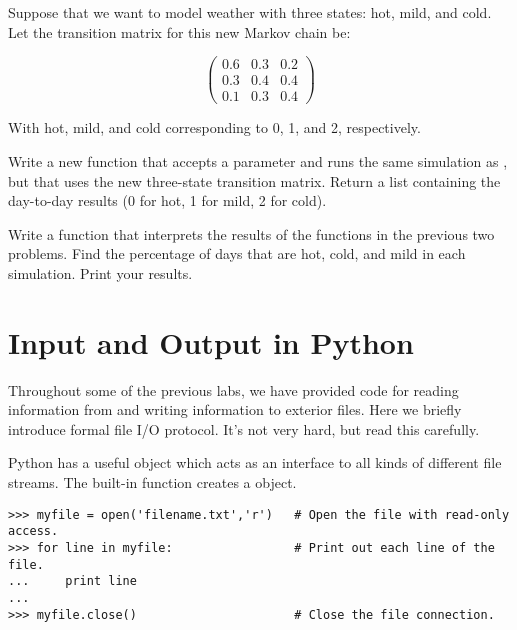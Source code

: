 \begin{problem}
Suppose that we want to model weather with three states: hot, mild, and cold.
Let the transition matrix for this new Markov chain be:

\[ \left( \begin{array}{ccc}
0.6 & 0.3 & 0.2\\
0.3 & 0.4 & 0.4\\
0.1 & 0.3 & 0.4\end{array} \right)\]

With hot, mild, and cold corresponding to 0, 1, and 2, respectively.

Write a new function that accepts a parameter  and runs the same simulation as , but that uses the new three-state transition matrix.
Return a list containing the day-to-day results (0 for hot, 1 for mild, 2 for cold).
\end{problem}

\begin{problem}
Write a function that interprets the results of the functions in the previous two problems.
Find the percentage of days that are hot, cold, and mild in each simulation.
Print your results.
\end{problem}

\section*{Input and Output in Python}

Throughout some of the previous labs, we have provided code for reading information from and writing information to exterior files.
Here we briefly introduce formal file I/O protocol.
It's not very hard, but read this carefully.

Python has a useful  object which acts as an interface to all kinds of different file streams.
The built-in function  creates a  object.

\begin{lstlisting}
>>> myfile = open('filename.txt','r') 	# Open the file with read-only access.
>>> for line in myfile:                 # Print out each line of the file.
... 	print line
...
>>> myfile.close() 						# Close the file connection.
\end{lstlisting}

